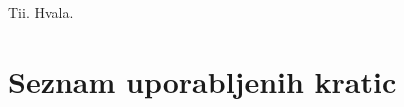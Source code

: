 \documentclass[a4paper, 12pt]{book}
\newcommand{\clearemptydoublepage}{\newpage{\pagestyle{empty}\cleardoublepage}}
\begin{document}
\thispagestyle{empty}\mbox{}{\textheight}\mbox{}\hfill\begin{minipage}{0.55\textwidth}%
	Tii. Hvala.
\normalfont\end{minipage}

\clearemptydoublepage


\pagestyle{empty}
\def\thepage{}%
\tableofcontents{}


\clearemptydoublepage


\chapter*{Seznam uporabljenih kratic}  %

\end{document}
